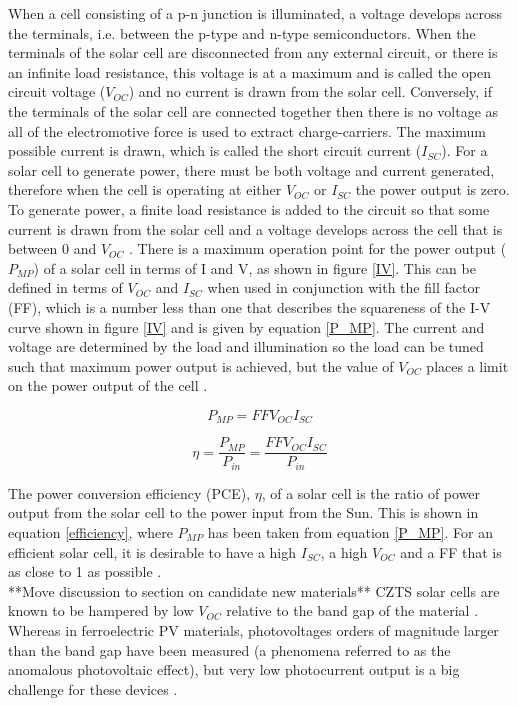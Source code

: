 When a cell consisting of a p-n junction is illuminated, a voltage develops across the terminals, i.e. between the p-type and n-type semiconductors. When the terminals of the solar cell are disconnected from any external circuit, or there is an infinite load resistance, this voltage is at a maximum and is called the open circuit voltage ($V_{OC}$) and no current is drawn from the solar cell. Conversely, if the terminals of the solar cell are connected together then there is no voltage as all of the electromotive force is used to extract charge-carriers. The maximum possible current is drawn, which is called the short circuit current ($I_{SC}$). For a solar cell to generate power, there must be both voltage and current generated, therefore when the cell is operating at either $V_{OC}$ or $I_{SC}$ the power output is zero. To generate power, a finite load resistance is added to the circuit so that some current is drawn from the solar cell and a voltage develops across the cell that is between 0 and $V_{OC}$ \cite{Nelson1}. There is a maximum operation point for the power output ($P_{MP}$) of a solar cell in terms of I and V, as shown in figure \ref{IV}. This can be defined in terms of $V_{OC}$ and $I_{SC}$ when used in conjunction with the fill factor (FF), which is a number less than one that describes the squareness of the I-V curve \cite{handbook} shown in figure \ref{IV} and is given by equation \ref{P_MP}. The current and voltage are determined by the load and illumination so the load can be tuned such that maximum power output is achieved, but the value of $V_{OC}$ places a limit on the power output of the cell \cite{Nelson1}.

\begin{equation} \label{P_MP}
P_{MP} = FFV_{OC}I_{SC}
\end{equation}

\begin{equation} \label{efficiency}
\eta = \frac{P_{MP}}{P_{in}} = \frac{FFV_{OC}I_{SC}}{P_{in}}
\end{equation}

The power conversion efficiency (PCE), $\eta$, of a solar cell is the ratio of power output from the solar cell to the power input from the Sun. This is shown in equation \ref{efficiency}, where $P_{MP}$ has been taken from equation \ref{P_MP}.
For an efficient solar cell, it is desirable to have a high $I_{SC}$, a high $V_{OC}$ and a FF that is as close to 1 as possible \cite{handbook}. \\

**Move discussion to section on candidate new materials** CZTS solar cells are known to be hampered by low $V_{OC}$ relative to the band gap of the material \cite{SS}. Whereas in ferroelectric PV materials, photovoltages orders of magnitude larger than the band gap have been measured (a phenomena referred to as the anomalous photovoltaic effect), but very low photocurrent output is a big challenge for these devices \cite{FE_PV_rev1}.\\

